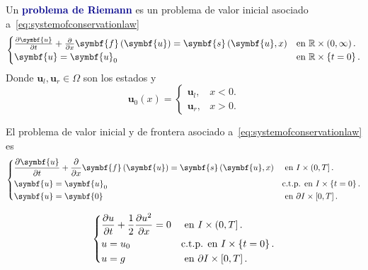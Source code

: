 \begin{definition}
	Un \textcolor{DarkBlue}{\bfseries problema de Riemann} es un
	problema de valor inicial asociado
	a~\eqref{eq:systemofconservationlaw}
	\begin{equation}\label{eq:cauchysystemofconservationlaw}
		\begin{cases}
			\diffp{\symbf{u}}{t}+
			\diffp{}{x}
			\symbf{f}\left(\symbf{u}\right)=
			\symbf{s}\left(\symbf{u},x\right) &
			\text{en }\mathbb{R}\times\left(0,\infty\right). \\
			\symbf{u}=\symbf{u}_{0}           &
			\text{en }\mathbb{R}\times\left\{t=0\right\}.
		\end{cases}
	\end{equation}
	Donde $\symbf{u}_{l},\symbf{u}_{r}\in\Omega$ son los estados y
	\begin{equation*}
		\symbf{u}_{0}\left(x\right)=
		\begin{cases}
			\symbf{u}_{l}, & x<0. \\
			\symbf{u}_{r}, & x>0.
		\end{cases}
	\end{equation*}
\end{definition}

\begin{definition}
	El problema de valor inicial y de frontera asociado
	a~\eqref{eq:systemofconservationlaw} es
	\begin{equation}
		\begin{dcases}
			\diffp{\symbf{u}}{t}+\diffp{}{x}\symbf{f}\left(\symbf{u}\right)=
			\symbf{s}\left(\symbf{u},x\right) & \text{ en }I\times\left(0,T\right].          \\
			\symbf{u}                                                      =
			\symbf{u}_{0}                     & \text{c.t.p. en }I\times\left\{t=0\right\}.  \\
			\symbf{u}                                                       =
			\symbf{0}                         & \text{ en }\partial I\times\left[0,T\right].
		\end{dcases}
	\end{equation}
\end{definition}

\begin{example}
	\begin{equation}
		\begin{dcases}
			\diffp{u}{t}+\frac{1}{2}\diffp{u^{2}}{x}=
			0     & \text{ en }I\times\left(0,T\right].          \\
			u                                                      =
			u_{0} & \text{c.t.p. en }I\times\left\{t=0\right\}.  \\
			u                                                       =
			g     & \text{ en }\partial I\times\left[0,T\right].
		\end{dcases}
	\end{equation}
\end{example}

